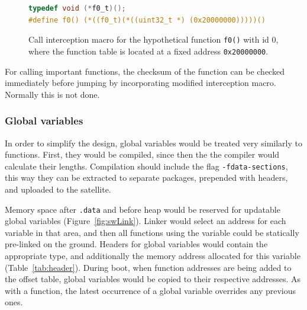 \begin{figure} [htb]
\begin{lstlisting}[language=C]
typedef void (*f0_t)();
#define f0() (*((f0_t)(*((uint32_t *) (0x20000000)))))()
\end{lstlisting}
\caption{Call interception macro for the hypothetical function \texttt{f0()} with id 0, where the function table is located at a fixed address \texttt{0x20000000}.}
\label{fig:macro}
\end{figure}

For calling important functions, the checksum of the function can be checked immediately before jumping by incorporating modified interception macro. Normally this is not done.

\subsubsection{Global variables}

In order to simplify the design, global variables would be treated very similarly to functions. First, they would be compiled, since then the the compiler would calculate their lengths. Compilation should include the flag \texttt{-fdata-sections}, this way they can be extracted to separate packages, prepended with headers, and uploaded to the satellite.

Memory space after \texttt{.data} and before heap would be reserved for updatable global variables  (Figure~\ref{fig:swLink}). Linker would select an address for each variable in that area, and then all functions using the variable could be statically pre-linked on the ground. Headers for global variables would contain the appropriate type, and additionally the memory address allocated for this variable (Table~\ref{tab:header}). During boot, when function addresses are being added to the offset table, global variables would be copied to their respective addresses. As with a function, the latest occurrence of a global variable overrides any previous ones.
